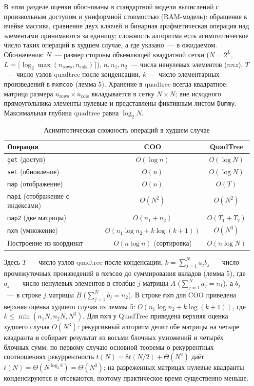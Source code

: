 \documentclass[a4paper]{article}
\begin{document}
В этом разделе оценки обоснованы в стандартной модели вычислений с произвольным доступом и униформной стоимостью (RAM-модель): обращение к ячейке массива, сравнение двух ключей и бинарная арифметическая операция над элементами принимаются за единицу; сложность алгоритма есть асимптотическое число таких операций в худшем случае, а где указано~--- в ожидаемом. Обозначения: $N$~--- размер стороны объемлющей квадратной сетки ($N = 2^L$, $L = \lceil \log_2 \max(n_{\mathrm{rows}}, n_{\mathrm{cols}}) \rceil$), $n, n_1, n_2$~--- числа ненулевых элементов ($nnz$), $T$~--- число узлов quadtree после конденсации, $k$~--- число элементарных произведений в \texttt{mxmcoo} (лемма 5). Хранение в quadtree всегда квадратное: матрица размера $n_{\mathrm{rows}}\times n_{\mathrm{cols}}$ вкладывается в сетку $N\times N$; вне исходного прямоугольника элементы нулевые и представлены фиктивным листом \texttt{Dummy}. Максимальная глубина quadtree равна $\log_2 N$.

\begin{table}[H]
    \centering
    \caption{Асимптотическая сложность операций в худшем случае}
    \label{tab:complexity}
    \begin{tabular}{lcc}
        \toprule
        Операция & COO & QuadTree \\
        \midrule
        \texttt{get} (доступ)        & $O(\log n)$ & $O(\log N)$ \\
        \texttt{set} (обновление)    & $O(n)$      & $O(\log N)$ \\
        \texttt{map} (отображение)   & $O(n)$      & $O(T)$      \\
        \texttt{mapi} (отображение с индексами) & $O(N^2)$      & $O(N^2)$    \\
        \texttt{map2} (две матрицы)  & $O(n_1 + n_2)$ & $O(T_1 + T_2)$ \\
        \texttt{mxm} (умножение)     & $O(n_1 \log n_2 + k \log(k + 1))$ & $O(N^3)$ \\
        \addlinespace
        Построение из координат      & $O(n \log n)$ (сортировка) & $O(n \log N)$ \\
        \bottomrule
    \end{tabular}
\end{table}

Здесь $T$~--- число узлов quadtree после конденсации, $k=\sum_{j=1}^{N} a_j b_j$~--- число промежуточных произведений в \texttt{mxmcoo} до суммирования вкладов (лемма 5), где $a_j$~--- число ненулевых элементов в столбце $j$ матрицы $A$ ($\sum_{j=1}^N a_j = n_1$), а $b_j$~--- в строке $j$ матрицы $B$ ($\sum_{j=1}^N b_j = n_2$). В строке \texttt{mxm} для COO приведена верхняя оценка худшего случая из леммы 5: $O(n_1 \log n_2 + k \log(k + 1))$, где $k \le \min(n_1 N, n_2 N, N^3)$. Для \texttt{mxm} у QuadTree приведена верхняя оценка худшего случая $O(N^3)$: рекурсивный алгоритм делит обе матрицы на четыре квадранта и собирает результат из восьми блочных умножений и четырёх блочных сумм; по первому случаю основной теоремы о рекуррентных соотношениях рекуррентность $t(N)=8t(N/2)+\Theta(N^2)$ даёт $t(N) = \Theta(N^{\log_2 8}) = \Theta(N^3)$; на разреженных матрицах нулевые квадранты конденсируются и отсекаются, поэтому практическое время существенно меньше.
\end{document}

